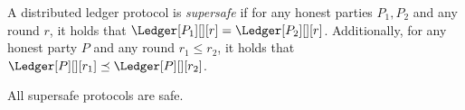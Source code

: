 
\begin{definition}[Supersafety]
  A distributed ledger protocol is \emph{supersafe} if
  for any honest parties $P_1, P_2$ and any round $r$, it holds that
  $\Ledger[P_1][][r] = \Ledger[P_2][][r]$. Additionally, for any honest party
  $P$ and any round $r_1 \leq r_2$, it holds that
  $\Ledger[P][][r_1] \preceq \Ledger[P][][r_2]$.
\end{definition}

All supersafe protocols are safe.
